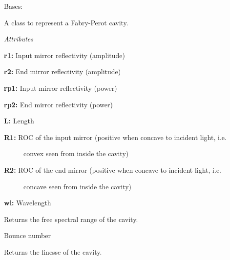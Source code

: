 \documentclass[letterpaper,10pt,english]{sphinxmanual}
\begin{document}
\begin{fulllineitems}
\label{api/gtrace.optics:gtrace.optics.cavity.Cavity}
Bases: 

A class to represent a Fabry-Perot cavity.

\emph{Attributes}

\textbf{r1:} Input mirror reflectivity (amplitude)

\textbf{r2:} End mirror reflectivity (amplitude)

\textbf{rp1:} Input mirror reflectivity (power)

\textbf{rp2:} End mirror reflectivity (power)

\textbf{L:} Length
\begin{description}
\item[{\textbf{R1:} ROC of the input mirror (positive when concave to incident light, i.e.}] \leavevmode
convex seen from inside the cavity)

\item[{\textbf{R2:} ROC of the end mirror (positive when concave to incident light, i.e.}] \leavevmode
concave seen from inside the cavity)

\end{description}

\textbf{wl:} Wavelength

\begin{fulllineitems}
\label{api/gtrace.optics:gtrace.optics.cavity.Cavity.FSR}
Returns the free spectral range of the cavity.

\end{fulllineitems}


\begin{fulllineitems}
\label{api/gtrace.optics:gtrace.optics.cavity.Cavity.Nbounce}
Bounce number

\end{fulllineitems}


\begin{fulllineitems}
\label{api/gtrace.optics:gtrace.optics.cavity.Cavity.finesse}
Returns the finesse of the cavity.


\end{fulllineitems}
\end{fulllineitems}
\end{document}

